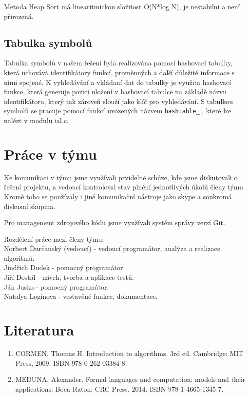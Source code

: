 \documentclass[12pt,a4paper,titlepage,final]{report}
\begin{document}
Metoda Heap Sort má linearitmickou složitost O(N*log N), je nestabilní a není přirozená.

\section{Tabulka symbolů}
Tabulka symbolů v našem řešení byla realizována pomocí hashovací tabulky, která uchovává identifikátory funkcí, proměnných a další důležité informace s nimi spojené. K vyhledávání a vkládaní dat do tabulky je využita hashovací funkce, která generuje pozici uložení v hashovací tabulce na základě názvu identifikátoru, který tak zároveň slouží jako klíč pro vyhledávání. S tabulkou symbolů se pracuje pomocí funkcí uvozených názvem \texttt{hashtable\_} , které lze nalézt v modulu ial.c.

\chapter{Práce v týmu} \label{tym}
Ke komunikaci v týmu jsme využívali prvidelné schůze, kde jsme diskutovali o řešení projektu, a vedoucí kontroloval stav plnění jednotlivých úkolů členy týmu. Kromě toho se používaly i jiné komunikační nástroje jako skype a soukromá diskusní skupina.

Pro management zdrojového kódu jsme využívali systém správy verzí Git.

Rozdělení práce mezi členy týmu:\\
Norbert Ďurčanský (vedoucí) - vedoucí programátor, analýza a realizace algoritmů.\\
Jindřich Dudek - pomocný programátor.\\
Jiří Dostál - návrh, tvorba a aplikace testů.\\
Ján Jusko - pomocný programátor.\\
Natalya Loginova - vestavěné funkce, dokumentace. \\

\chapter{Literatura} \label{literatura}
\begin{enumerate}
  \item CORMEN, Thomas H. Introduction to algorithms. 3rd ed. Cambridge: MIT Press, 2009. ISBN 978-0-262-03384-8.
  \item MEDUNA, Alexander. Formal languages and computation: models and their applications. Boca Raton: CRC Press, 2014. ISBN 978-1-4665-1345-7.
\end{enumerate}
\newpage
\appendix
\clearpage%
\thispagestyle{empty}%
\end{document}
